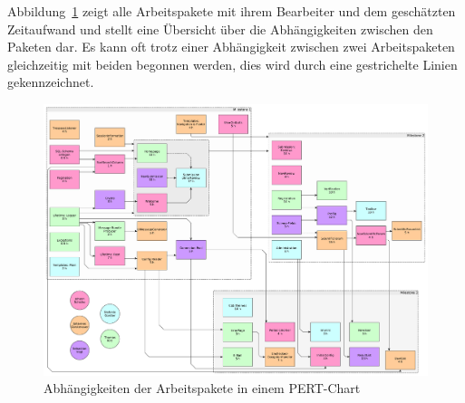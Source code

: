 
Abbildung~\ref{fig:pert} zeigt alle Arbeitspakete mit ihrem Bearbeiter und dem geschätzten Zeitaufwand
und stellt eine Übersicht über die Abhängigkeiten zwischen den Paketen dar.
Es kann oft trotz einer Abhängigkeit zwischen zwei Arbeitspaketen gleichzeitig mit beiden begonnen werden,
dies wird durch eine gestrichelte Linien gekennzeichnet.

\begin{figure}
    \includegraphics[width=\textwidth]{graphics/pert}
    \caption{Abhängigkeiten der Arbeitspakete in einem PERT-Chart}
    \label{fig:pert}
\end{figure}